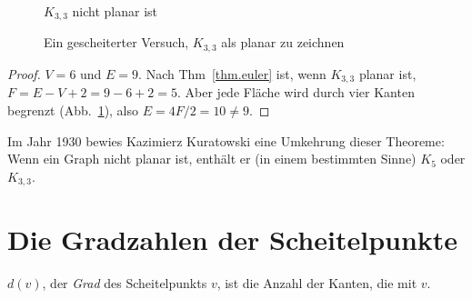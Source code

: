 \begin{figure}[b]
\begin{minipage}{.45\textwidth}
\begin{center}
\caption{$K_{3,3}$ nicht planar ist}\label{f.five-k33}
\end{center}
\end{minipage}
\hfill
\begin{minipage}{.45\textwidth}
\begin{center}
\caption{Ein gescheiterter Versuch, $K_{3,3}$ als planar zu zeichnen}\label{f.five-k33-failed}
\end{center}
\end{minipage}
\end{figure}

\begin{proof}
$V=6$ und $E=9$. Nach Thm~\ref{thm.euler} ist, wenn $K_{3,3}$ planar ist, $F=E-V+2=9-6+2=5$. Aber jede Fläche wird durch vier Kanten begrenzt (Abb.~\ref{f.five-k33-failed}), also $E=4F/2=10\neq 9$.
\end{proof}

Im Jahr 1930 bewies Kazimierz Kuratowski eine Umkehrung dieser Theoreme: Wenn ein Graph nicht planar ist, enthält er (in einem bestimmten Sinne) $K_5$ oder $K_{3,3}$.

\section{Die Gradzahlen der Scheitelpunkte}\label{s.degrees}

\begin{definition}
$d(v)$, der \emph{Grad} des Scheitelpunkts $v$, ist die Anzahl der Kanten, die mit $v$.
\end{definition}

